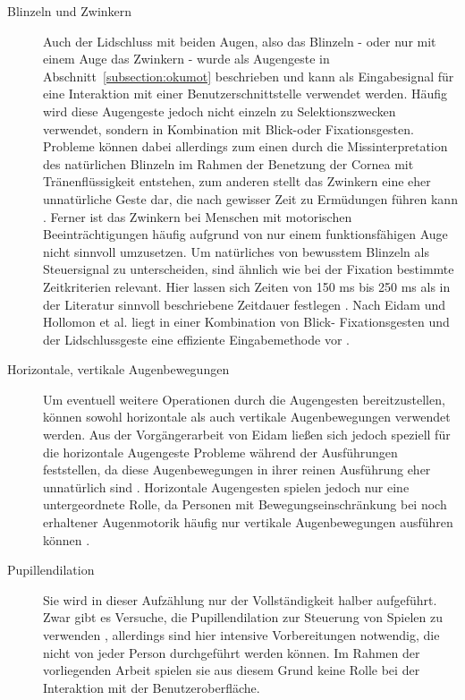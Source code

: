 \begin{description}
\item[Blinzeln und Zwinkern] Auch der Lidschluss mit beiden Augen, also das Blinzeln - oder nur mit einem Auge das Zwinkern - wurde als Augengeste in Abschnitt~\ref{subsection:okumot} beschrieben und kann als Eingabesignal für eine Interaktion mit einer Benutzerschnittstelle verwendet werden. Häufig wird diese Augengeste jedoch nicht einzeln zu Selektionszwecken verwendet, sondern in Kombination mit Blick-oder Fixationsgesten. Probleme können dabei allerdings zum einen durch die Missinterpretation des natürlichen Blinzeln im Rahmen der Benetzung der Cornea mit Tränenflüssigkeit entstehen, zum anderen stellt das Zwinkern eine eher unnatürliche Geste dar, die nach gewisser Zeit zu Ermüdungen führen kann \cite{Hollomon2017}. Ferner ist das Zwinkern bei Menschen mit motorischen Beeinträchtigungen häufig aufgrund von nur einem funktionsfähigen Auge nicht sinnvoll umzusetzen. Um natürliches von bewusstem Blinzeln als Steuersignal zu unterscheiden, sind ähnlich wie bei der Fixation bestimmte Zeitkriterien relevant. Hier lassen sich Zeiten von 150 ms bis 250 ms als in der Literatur sinnvoll beschriebene Zeitdauer festlegen \cite{Eidam2015}. Nach Eidam und Hollomon et al. liegt in einer Kombination von Blick- \bzw Fixationsgesten und der Lidschlussgeste eine effiziente Eingabemethode vor \cite{Hollomon2017,Eidam2015}.
\item[Horizontale, vertikale Augenbewegungen] Um eventuell weitere Operationen durch die Augengesten bereitzustellen, können sowohl horizontale als auch vertikale Augenbewegungen verwendet werden. Aus der Vorgängerarbeit von Eidam ließen sich jedoch speziell für die horizontale Augengeste Probleme während der Ausführungen feststellen, da diese Augenbewegungen in ihrer reinen Ausführung eher unnatürlich sind \cite{Eidam2015}. Horizontale Augengesten spielen jedoch nur eine untergeordnete Rolle, da Personen mit Bewegungseinschränkung bei noch erhaltener Augenmotorik häufig nur vertikale Augenbewegungen ausführen können \cite{Eidam2015}.  
\item[Pupillendilation] Sie wird in dieser Aufzählung nur der Vollständigkeit halber aufgeführt. Zwar gibt es Versuche, die Pupillendilation zur Steuerung von Spielen zu verwenden \cite{Ekman2008}, allerdings sind hier intensive Vorbereitungen notwendig, die nicht von jeder Person durchgeführt werden können. Im Rahmen der vorliegenden Arbeit spielen sie aus diesem Grund keine Rolle bei der Interaktion mit der Benutzeroberfläche.
\end{description}

